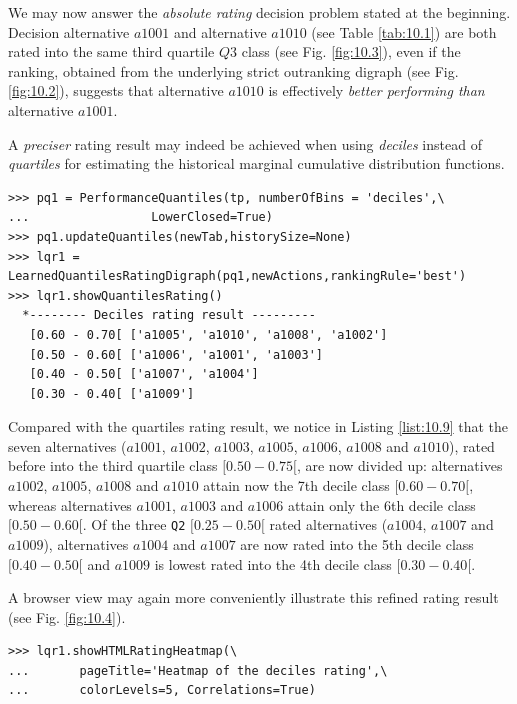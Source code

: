 We may now answer the \emph{absolute rating} decision problem stated at the beginning. Decision alternative $a1001$ and alternative $a1010$ (see Table \ref{tab:10.1}) are both rated into the same third quartile $Q3$ class (see Fig. \ref{fig:10.3}), even if the \Copeland ranking, obtained from the underlying strict outranking digraph (see Fig. \ref{fig:10.2}), suggests that alternative $a1010$ is effectively \emph{better performing than} alternative $a1001$. 

A \emph{preciser} rating result may indeed be achieved when using \emph{deciles} instead of \emph{quartiles} for estimating the historical marginal cumulative distribution functions.

\begin{lstlisting}[caption={Absolute deciles rating result},label=list:10.9]
>>> pq1 = PerformanceQuantiles(tp, numberOfBins = 'deciles',\
...                 LowerClosed=True)
>>> pq1.updateQuantiles(newTab,historySize=None)
>>> lqr1 = LearnedQuantilesRatingDigraph(pq1,newActions,rankingRule='best')
>>> lqr1.showQuantilesRating()
  *-------- Deciles rating result ---------
   [0.60 - 0.70[ ['a1005', 'a1010', 'a1008', 'a1002']
   [0.50 - 0.60[ ['a1006', 'a1001', 'a1003']
   [0.40 - 0.50[ ['a1007', 'a1004']
   [0.30 - 0.40[ ['a1009']
\end{lstlisting}

Compared with the quartiles rating result, we notice in Listing \ref{list:10.9} that the seven alternatives ($a1001$, $a1002$, $a1003$, $a1005$, $a1006$, $a1008$ and $a1010$), rated before into the third quartile class $[0.50-0.75[$, are now divided up: alternatives $a1002$, $a1005$, $a1008$ and $a1010$ attain now the 7th decile class $[0.60-0.70[$, whereas alternatives $a1001$, $a1003$ and $a1006$ attain only the 6th decile class $[0.50-0.60[$. Of the three \texttt{Q2} $[0.25-0.50[$ rated alternatives ($a1004$, $a1007$ and $a1009$), alternatives $a1004$ and $a1007$ are now rated into the 5th decile class $[0.40-0.50[$ and $a1009$ is lowest rated into the 4th decile class $[0.30-0.40[$.

A browser view may again more conveniently illustrate this refined rating result (see Fig. \ref{fig:10.4}).

\begin{lstlisting}
>>> lqr1.showHTMLRatingHeatmap(\
...       pageTitle='Heatmap of the deciles rating',\
...       colorLevels=5, Correlations=True)
\end{lstlisting}

